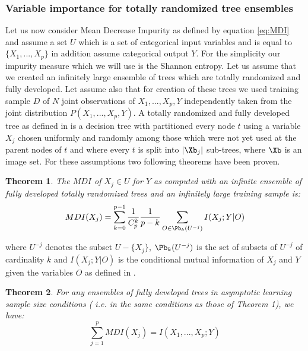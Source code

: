 \subsubsection{Variable importance for totally randomized tree ensembles}

Let us now consider Mean Decrease Impurity as defined by equation \eqref{eq:MDI} and assume a set $U$ which is a set of categorical input variables and is equal to $\{X_1,...,X_p\}$ in addition assume categorical output $Y$. For the simplicity our impurity measure which we will use is the Shannon entropy. Let us assume that we created an infinitely large ensemble of trees which are totally randomized and fully developed. Let assume also that for creation of these trees we used training sample $D$ of $N$ joint observations of $X_1,...,X_p,Y$ independently taken from the joint distribution $P(X_1,...,X_p,Y)$. A totally randomized and fully developed tree as defined in \cite{louppe2013understanding} is a decision tree with partitioned every node $t$ using a variable $X_j$ chosen uniformly and randomly among those which were not yet used at the parent nodes of $t$
and where every $t$ is split into $|\Xb_j|$ sub-trees, where $\Xb$ is an image set. For these assumptions two following theorems have been proven.

\newtheorem{theorem}{Theorem}
\begin{theorem}
    The $MDI$ of $X_j \in U$ for $Y$ as computed with an infinite ensemble of fully developed totally randomized trees and an infinitely large training sample is:
    \begin{equation}
	{MDI}( X_{j} ) = \displaystyle \sum_{k=0}^{p-1}\frac{1}{C^k_p}\frac{1}{p-k} \displaystyle\sum_{O \in \Pb_{k}(U^{-j})} I(X_j;Y|O)
    \end{equation}
    
\end{theorem}
where $U^{-j}$ denotes the subset $U-\{X_j\}$, $\Pb_{k}(U^{-j})$ is the set of subsets of $U^{-j}$
of cardinality $k$ and $I(X_j;Y|O)$ is the conditional mutual information of $X_j$ and $Y$ given the variables $O$  as defined in \cite{kohavi1997importance}.

\begin{theorem}
	For any ensembles of fully developed trees in asymptotic learning sample size conditions (
	i.e. in the same conditions as those of Theorem 1), we have:
	\begin{equation}
	\displaystyle \sum_{j=1}^{p}{MDI}( X_{j} ) = I(X_1,...,X_p;Y)
     \end{equation}
	
\end{theorem}

